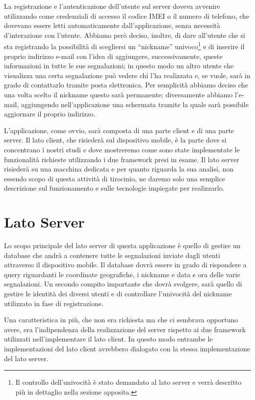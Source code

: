     \noindent La registrazione e l'autenticazione dell'utente sul server doveva avvenire
    utilizzando come credenziali di accesso il codice IMEI o il numero di
    telefono, che dovevano essere letti automaticamente dall'applicazione,
    senza necessità d'interazione con l'utente. Abbiamo però deciso, inoltre, di
    dare all'utente che si sta registrando la possibilità di scegliersi un
    ``nickname'' univoco\footnote{Il controllo dell'univocità è stato demandato
    al lato server e verrà descritto più in dettaglio nella sezione apposita.}
    e di inserire il proprio indirizzo e-mail con l'idea di aggiungere,
    successivamente, queste informazioni in tutte le sue segnalazioni; in questo
    modo un altro utente che visualizza una certa segnalazione può vedere chi
    l'ha realizzata e, se vuole, sarà in grado di contattarlo tramite posta
    elettronica. Per semplicità abbiamo deciso che una volta scelto il nickname
    questo sarà permanente; diversamente abbiamo l'e-mail, aggiungendo nell'applicazione una
    schermata tramite la quale sarà possibile aggiornare il proprio indirizzo.

    L'applicazione, come ovvio, sarà composta di una parte client e di una parte
    server. Il lato client, che risiederà sul dispositivo mobile, è la parte dove
    si concentrano i nostri studi e dove
    mostreremo come sono state implementate le funzionalità richieste
    utilizzando i due frame\-work presi in esame. Il lato server risiederà
    su una macchina dedicata e per quanto riguarda la sua analisi, non
    essendo scopo di questa attività di tirocinio, ne daremo solo una
    semplice descrizione sul funzionamento e sulle tecnologie
    impiegate per realizzarlo.

    \section{Lato Server}
        Lo scopo principale del lato server di questa applicazione è quello di
        gestire un database che andrà a contenere tutte le segnalazioni inviate
        dagli utenti attraverso il dispositivo mobile. Il
        database dovrà essere in grado di rispondere a query riguardanti
        le coordinate geografiche, i nickname e data e
        ora delle varie segnalazioni. Un secondo compito importante che dovrà
        svolgere, sarà quello di gestire le identità dei diversi utenti e di
        controllare l'univocità del nickname utilizzato in fase di
        registrazione.

        Una caratteristica in più, che non era richiesta ma che ci sembrava
        opportuno avere, era l'indipendenza della realizzazione del server
        rispetto ai due frame\-work utilizzati nell'implementare il lato client.
        In questo modo entrambe le implementazioni del lato client avrebbero
        dialogato con la stessa implementazione del lato server.


